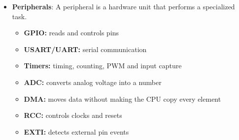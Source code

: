 \documentclass{report}
\begin{document}
\begin{itemize}
            \bigbreak \noindent 
            The first vector-table entry contains the initial value that the processor loads into the MSP:
            \bigbreak \noindent 
            \begin{ccode}
                Address       Value          Meaning
                0x08000000    0x20020000     Initial MSP
                0x08000004    0x08000151     Reset_Handler address
            \end{ccode}
            \bigbreak \noindent 
            During reset, the processor effectively performs:
            \bigbreak \noindent 
            \begin{ccode}
                MSP <- memory[0x00000000]
                PC  <- memory[0x00000004]
            \end{ccode}
            \bigbreak \noindent 
            When booting from main flash, those locations correspond to:
            \bigbreak \noindent 
            \begin{ccode}
                MSP <- memory[0x08000000]
                PC  <- memory[0x08000004]
            \end{ccode}
            \begin{itemize}
                \item 0x08000000 is where the initial MSP value is stored in flash.
                \item 0x20020000 is the SRAM address loaded into the MSP register.
            \end{itemize}
            \textbf{Note:} Stacks on Cortex-M normally grow toward lower addresses.
        \item \textbf{Peripherals}: A peripheral is a hardware unit that performs a specialized task.
            \begin{itemize}
                \item \textbf{GPIO:} reads and controls pins
                \item \textbf{USART/UART:} serial communication
                \item \textbf{Timers:} timing, counting, PWM and input capture
                \item \textbf{ADC:} converts analog voltage into a number
                \item \textbf{DMA:} moves data without making the CPU copy every element
                \item \textbf{RCC:} controls clocks and resets
                \item \textbf{EXTI:} detects external pin events

\end{itemize}
\end{itemize}
\end{document}
